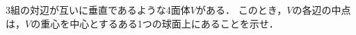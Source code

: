 \documentclass[../../main.tex]{subfiles}
\begin{document}
3組の対辺が互いに垂直であるような4面体$V$がある．
このとき，$V$の各辺の中点は，$V$の重心を中心とするある1つの球面上にあることを示せ．
\end{document}
